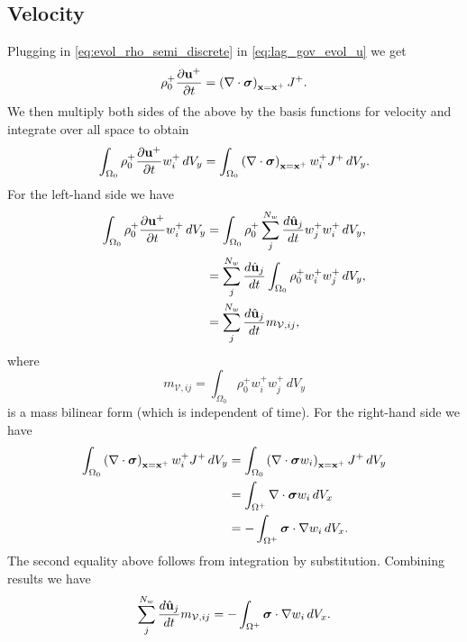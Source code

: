 \documentclass[11pt]{report}
\begin{document}
\subsection{Velocity}
Plugging in \cref{eq:evol_rho_semi_discrete} in \cref{eq:lag_gov_evol_u} we get
\begin{equation}
    \rho^+_0 \frac{\partial \mathbf{u}^+}{\partial t} = \left ( \nabla \cdot \bm \sigma \right )_{\mathbf{x} = \mathbf{x}^+} J^+.
\end{equation}
We then multiply both sides of the above by the basis functions for velocity and integrate over all space to obtain
\begin{equation}
    \int_{\Omega_0} \rho^+_0 \frac{\partial \mathbf{u}^+}{\partial t} w^+_i \, dV_y = \int_{\Omega_0} \left ( \nabla \cdot \bm \sigma \right )_{\mathbf{x} = \mathbf{x}^+} w^+_i J^+ \, dV_y.
\end{equation}
For the left-hand side we have
\begin{align}
    \int_{\Omega_0} \rho^+_0 \frac{\partial \mathbf{u}^+}{\partial t} w^+_i \, dV_y &= \int_{\Omega_0} \rho^+_0 \sum_j^{N_w} \frac{d \hat{\mathbf{u}}_j}{dt} w^+_j w^+_i \, dV_y, \nonumber \\
    &= \sum_j^{N_w} \frac{d \hat{\mathbf{u}}_j}{dt} \int_{\Omega_0} \rho^+_0 w^+_i w^+_j \, dV_y, \nonumber \\
    &= \sum_j^{N_w} \frac{d \hat{\mathbf{u}}_j}{dt} m_{\mathcal{V},ij},
\end{align}
where
\begin{equation}
    m_{\mathcal{V},ij} = \int_{\Omega_0} \rho^+_0 w^+_i w^+_j \, dV_y
\end{equation}
is a mass bilinear form (which is independent of time). For the right-hand side we have
\begin{align}
    \int_{\Omega_0} \left ( \nabla \cdot \bm \sigma \right )_{\mathbf{x} = \mathbf{x}^+} w^+_i J^+ \, dV_y & = \int_{\Omega_0} \left ( \nabla \cdot \bm \sigma w_i \right )_{\mathbf{x} = \mathbf{x}^+} J^+ \, dV_y \nonumber \\
    & = \int_{\Omega^+} \nabla \cdot \bm \sigma w_i \, dV_x \nonumber \\
    & = -\int_{\Omega^+} \bm \sigma \cdot \nabla w_i \, dV_x.
\end{align}
The second equality above follows from integration by substitution. Combining results we have
\begin{equation}
    \label{eq:evol_u_semi_discrete}
    \sum_j^{N_w} \frac{d \hat{\mathbf{u}}_j}{d t} m_{\mathcal{V},ij} = -\int_{\Omega^+} \bm \sigma \cdot \nabla w_i \, dV_x.
\end{equation}
\end{document}
